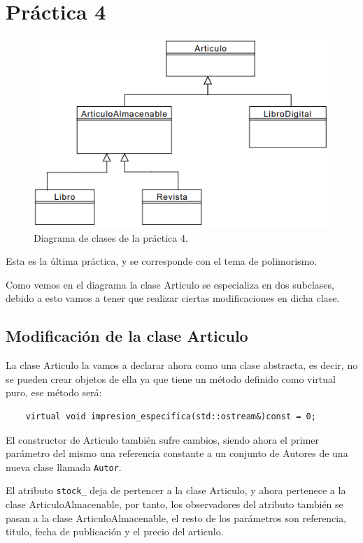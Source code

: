 \chapter{Práctica 4}
\begin{figure}[h]
  \begin{center}
    \includegraphics[width=\textwidth]{Pics/P4_1.png}
  \end{center}
  \caption{Diagrama de clases de la práctica 4.}
\end{figure}

Esta es la última práctica, y se corresponde con el tema de polimorismo.

Como vemos en el diagrama la clase Articulo se especializa en dos subclases, debido a esto vamos a tener que realizar ciertas modificaciones en dicha clase.
\section{Modificación de la clase Articulo}
La clase Articulo la vamos a declarar ahora como una clase abstracta, es decir, no se pueden crear objetos de ella ya que tiene un método definido como virtual puro, ese método será:
\begin{center}
  \begin{verbatim}
    virtual void impresion_especifica(std::ostream&)const = 0;
  \end{verbatim}
\end{center}

El constructor de Articulo también sufre cambios, siendo ahora el primer parámetro del mismo una referencia constante a un conjunto de Autores de una nueva clase llamada \texttt{Autor}.

El atributo \texttt{stock\_} deja de pertencer a la clase Articulo, y ahora pertenece a la clase ArticuloAlmacenable, por tanto, los observadores del atributo también se pasan a la clase ArticuloAlmacenable, el resto de los parámetros son referencia, titulo, fecha de publicación y el precio del articulo.

